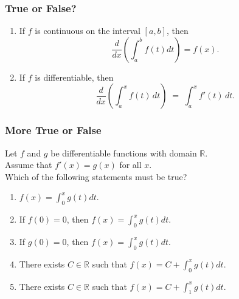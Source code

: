 \documentclass[14pt]{beamer}
\begin{document}
	\begin{frame}[t]
		\fontsize{13}{13}\selectfont
		\frametitle{True or False?}

		\begin{enumerate}
			\item If $f$ is continuous on the interval $[a,b]$, then
				\[
					\frac{d}{dx}\left( \int_{a}^{b}f(t)dt\right)=f(x).
				\]

				\vspace{4mm}

			\item If $f$ is differentiable, then
				\[
					\frac{d}{dx}\left(\int_{a}^{x}f(t)\,dt \right) \; = \; \int_{a}^{x}f'(t
					) \,dt .
				\]
		\end{enumerate}
	\end{frame}

	\begin{frame}[t]
		\fontsize{13}{13}\selectfont
		\frametitle{More True or False}

		Let $f$ and $g$ be differentiable functions with domain $\displaystyle \mathbb{R}$.
		\\ Assume that $\displaystyle f'(x) = g(x)$ for all $x$. \\ Which of the following
		statements must be true?

		\begin{enumerate}
			\item $\displaystyle f(x) = \int_{0}^{x}g(t) dt$.

			\item If $\displaystyle f(0)=0$, then
				$\displaystyle f(x) = \int_{0}^{x}g(t) dt$.

			\item If $\displaystyle g(0)=0$, then
				$\displaystyle f(x) = \int_{0}^{x}g(t) dt$.

			\item There exists $C \in \mathbb{R}$ such that $\displaystyle f(x) = C + \int
				_{0}^{x}g(t) dt$.

			\item There exists $C\in \mathbb{R}$ such that $\displaystyle f(x) = C + \int
				_{1}^{x}g(t) dt$.
		\end{enumerate}
	\end{frame}
\end{document}
